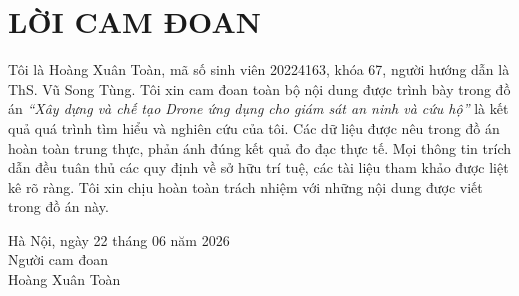 \section*{LỜI CAM ĐOAN}
\thispagestyle{empty}

Tôi là Hoàng Xuân Toàn, mã số sinh viên 20224163, khóa 67, người hướng dẫn là ThS. Vũ Song Tùng. Tôi xin cam đoan toàn bộ nội dung được trình bày trong đồ án \textit{``Xây dựng và chế tạo Drone ứng dụng cho giám sát an ninh và cứu hộ''} là kết quả quá trình tìm hiểu và nghiên cứu của tôi. Các dữ liệu được nêu trong đồ án hoàn toàn trung thực, phản ánh đúng kết quả đo đạc thực tế. Mọi thông tin trích dẫn đều tuân thủ các quy định về sở hữu trí tuệ, các tài liệu tham khảo được liệt kê rõ ràng. Tôi xin chịu hoàn toàn trách nhiệm với những nội dung được viết trong đồ án này.

\vspace{1.5cm}
\hfill
\begin{minipage}{0.5\textwidth}
    \centering
    Hà Nội, ngày 22 tháng 06 năm 2026 \\
    \vspace{0.3cm}
    Người cam đoan \\
    \vspace{2cm}
    Hoàng Xuân Toàn
\end{minipage}
\cleardoublepage
